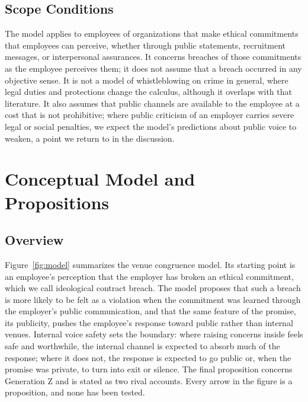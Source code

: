 \documentclass[12pt,a4paper]{article}
\theoremstyle{definition}
\begin{document}
\subsection{Scope Conditions}

The model applies to employees of organizations that make ethical commitments that employees can perceive, whether through public statements, recruitment messages, or interpersonal assurances. It concerns breaches of those commitments as the employee perceives them; it does not assume that a breach occurred in any objective sense. It is not a model of whistleblowing on crime in general, where legal duties and protections change the calculus, although it overlaps with that literature. It also assumes that public channels are available to the employee at a cost that is not prohibitive; where public criticism of an employer carries severe legal or social penalties, we expect the model's predictions about public voice to weaken, a point we return to in the discussion.

\section{Conceptual Model and Propositions}
\subsection{Overview}

Figure~\ref{fig:model} summarizes the venue congruence model. Its starting point is an employee's perception that the employer has broken an ethical commitment, which we call ideological contract breach. The model proposes that such a breach is more likely to be felt as a violation when the commitment was learned through the employer's public communication, and that the same feature of the promise, its publicity, pushes the employee's response toward public rather than internal venues. Internal voice safety sets the boundary: where raising concerns inside feels safe and worthwhile, the internal channel is expected to absorb much of the response; where it does not, the response is expected to go public or, when the promise was private, to turn into exit or silence. The final proposition concerns Generation Z and is stated as two rival accounts. Every arrow in the figure is a proposition, and none has been tested.
\end{document}
